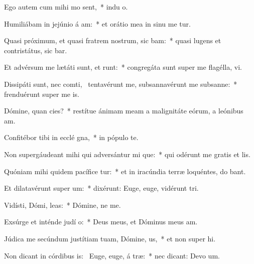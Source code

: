 \item Ego autem cum mihi mo sent,~* indu o.
\item Humiliábam in jejúnio á am:~* et orátio mea in sinu me tur.
\item Quasi próximum, et quasi fratrem nostrum, sic bam:~* quasi lugens et contristátus, sic bar.
\item Et advérsum me lætáti sunt, et runt:~* congregáta sunt super me flagélla,  vi.
\item Dissipáti sunt, nec comti,~\pscross{} tentavérunt me, subsannavérunt me subsanne:~* frenduérunt super me  is.
\item Dómine, quan cies?~* restítue ánimam meam a malignitáte eórum, a leónibus  am.
\item Confitébor tibi in ecclé gna,~* in pópulo   te.
\item Non supergáudeant mihi qui adversántur mi que:~* qui odérunt me gratis et  lis.
\item Quóniam mihi quidem pacífice tur:~* et in iracúndia terræ loquéntes, do bant.
\item Et dilatavérunt super   um:~* dixérunt: Euge, euge, vidérunt  tri.
\item Vidísti, Dómi,  leas:~* Dómine, ne   me.
\item Exsúrge et inténde judí o:~* Deus meus, et Dóminus meus   am.
\item Júdica me secúndum justítiam tuam, Dómine,  us,~* et non super hi.
\item Non dicant in córdibus is:~\pscross{} Euge, euge, á træ:~* nec dicant: Devo um.
